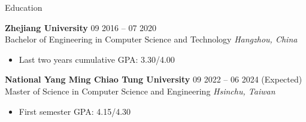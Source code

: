 \documentclass{resume} %
\begin{document}

\begin{rSection}{Education}

{\bf Zhejiang University} \hfill {09 2016 – 07 2020}\\
Bachelor of Engineering in Computer Science and Technology \hfill \textit{Hangzhou, China}
\begin{itemize}
    \item Last two years cumulative GPA: 3.30/4.00
\end{itemize}

{\bf National Yang Ming Chiao Tung University} \hfill {09 2022 – 06 2024 (Expected)}\\
Master of Science in Computer Science and Engineering \hfill \textit{Hsinchu, Taiwan}
\begin{itemize}
    \item First semester GPA: 4.15/4.30
\end{itemize}

\end{rSection}

\end{document}
